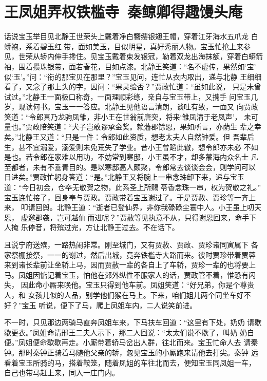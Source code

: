 \chapter{王凤姐弄权铁槛寺~秦鲸卿得趣馒头庵}

话说宝玉举目见北静王世荣头上戴着净白簪缨银翅王帽，穿着江牙海水五爪龙
白蟒袍，系着碧玉红带，面如美玉，目似明星，真好秀丽人物。宝玉忙抢上来参
见，世荣从轿内伸手搀住。见宝玉戴着束发银冠，勒着双龙出海抹额，穿着白蟒箭
袖，围着攒珠银带，面若春花，目如点漆。北静王笑道：“名不虚传，果然如‘宝’
似‘玉’。”问：“衔的那宝贝在那里？”宝玉见问，连忙从衣内取出，递与北静
王细细看了，又念了那上头的字，因问：“果灵验否？”贾政忙道：“虽如此说，
只是未曾试过。”北静王一面极口称奇，一面理顺彩绦，亲自与宝玉带上，又携手
问宝玉几岁，现读何书。宝玉一一答应。北静王见他语言清朗，谈吐有致，一面又
向贾政笑道：“令郎真乃龙驹凤雏，非小王在世翁前唐突，将来‘雏凤清于老凤声’，
未可量也。”贾政陪笑道：“犬子岂敢谬承金奖。赖藩郡馀恩，果如所言，亦荫生
辈之幸矣。”北静王又道：“只是一件：令郎如此资质，想老太夫人自然钟爱。但
吾辈后生，甚不宜溺爱，溺爱则未免荒失了学业。昔小王曾蹈此辙，想令郎亦未必
不如是也。若令郎在家难以用功，不妨常到寒邸，小王虽不才，却多蒙海内众名士
凡至都者，未有不垂青目的。是以寒邸高人颇聚，令郎常去谈谈会会，则学问可以
日进矣。”贾政忙躬身答道：“是。”北静王又将腕上一串念珠卸下来，递与宝玉
道：“今日初会，仓卒无敬贺之物，此系圣上所赐苓香念珠一串，权为贺敬之礼。”
宝玉连忙接了，回身奉与贾政。贾政带着宝玉谢过了。于是贾赦、贾珍等一齐上来，
叩请回舆。北静王道：“逝者已登仙界，非你我碌碌尘寰中人。小王虽上叨天恩，
虚邀郡袭，岂可越仙而进呢？”贾赦等见执意不从，只得谢恩回来，命手下人掩
乐停音，将殡过完，方让北静王过去。不在话下。

且说宁府送殡，一路热闹非常。刚至城门，又有贾赦、贾政、贾珍诸同寅属下
各家祭棚接祭，一一的谢过，然后出城，竟奔铁槛寺大路而来。彼时贾珍带着贾蓉
来到诸长辈前让坐轿上马，因而贾赦一辈的各自上了车轿，贾珍一辈的也将要上
马。凤姐因惦记着宝玉，怕他在郊外纵性不服家人的话，贾政管不着，惟恐有闪失，
因此命小厮来唤他。宝玉只得到他车前。凤姐笑道：“好兄弟，你是个尊贵人，和
女孩儿似的人品，别学他们猴在马上。下来，咱们姐儿两个同坐车好不好？”宝玉
听说，便下了马，爬上凤姐车内，二人说笑前进。

不一时，只见那边两骑马直奔凤姐车来，下马扶车回道：“这里有下处，奶奶
请歇歇更衣。”凤姐命请邢王二夫人示下，那二人回说：“太太们说不歇了，叫奶
奶自便。”凤姐便命歇歇再走。小厮带着轿马岔出人群，往北而来。宝玉忙命人去
请秦钟。那时秦钟正骑着马随他父亲的轿，忽见宝玉的小厮跑来请他去打尖。秦钟
远看着宝玉所骑的马，搭着鞍笼，随着凤姐的车往北而去，便知宝玉同凤姐一车，
自己也带马赶上来，同入一庄门内。

